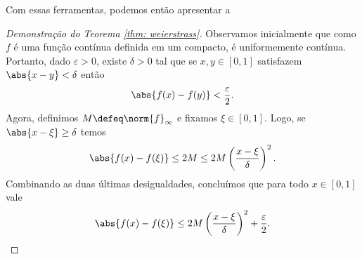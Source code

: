 Com essas ferramentas, podemos então apresentar a
 \begin{proof}[Demonstração do Teorema \ref{thm: weierstrass}]
    Observamos inicialmente que como \( f \) é uma função contínua definida em um compacto, é uniformemente contínua.
    Portanto, dado \( \varepsilon > 0 \), existe \( \delta > 0 \) tal que se \( x, y \in [0, 1] \) satisfazem \( \abs{ x - y } < \delta \) então \[
        \abs{ f(x) - f(y) } < \frac{ \varepsilon }{ 2 }
    .\]
    Agora, definimos \( M \defeq \norm{ f }_{ \infty } \) e fixamos \( \xi \in [0, 1] \).
    Logo, se \( \abs{ x - \xi } \geq \delta \) temos \[
        \abs{ f(x) - f(\xi) } \leq 2M \leq 2M \left( \frac{ x - \xi }{ \delta } \right)^2
    .\]
    Combinando as duas últimas desigualdades, concluímos que para todo \( x \in [0, 1] \) vale
    \begin{equation}
        \abs{ f(x) - f(\xi) } \leq 2M \left( \frac{ x - \xi }{ \delta } \right)^2 + \frac{ \varepsilon }{ 2 }
        \label{eq: weierstrass_bound_1}
    .\end{equation}


\end{proof}
